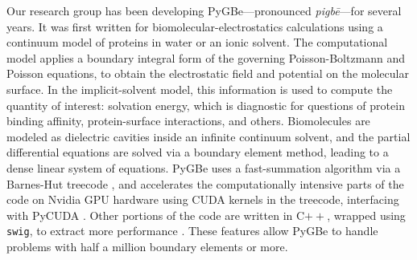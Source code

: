 Our research group has been developing PyGBe---pronounced \emph{pigb\={e}}---for several years. 
It was first written for biomolecular-electrostatics calculations using a continuum model of proteins in water or an ionic solvent. 
The computational model applies a boundary integral form of the governing Poisson-Boltzmann and Poisson equations, to obtain the electrostatic field and potential on the molecular surface. 
In the implicit-solvent model, this information is used to compute the quantity of interest: solvation energy, which is diagnostic for questions of protein binding affinity, protein-surface interactions, and others. 
Biomolecules are modeled as dielectric cavities inside an infinite continuum solvent, and the partial differential equations are solved via a boundary element method, leading to a dense linear system of equations. 
PyGBe uses a fast-summation algorithm via a Barnes-Hut treecode \cite{BarnesHut1986}, and accelerates the computationally intensive parts of the code on Nvidia GPU hardware using CUDA kernels in the treecode, interfacing with PyCUDA \cite{klockner2012pycuda}. 
Other portions of the code are written in C$++$, wrapped using \texttt{swig}, to extract more performance \cite{CooperETal2016}. 
These features allow PyGBe to handle problems with half a million boundary elements or more. 

